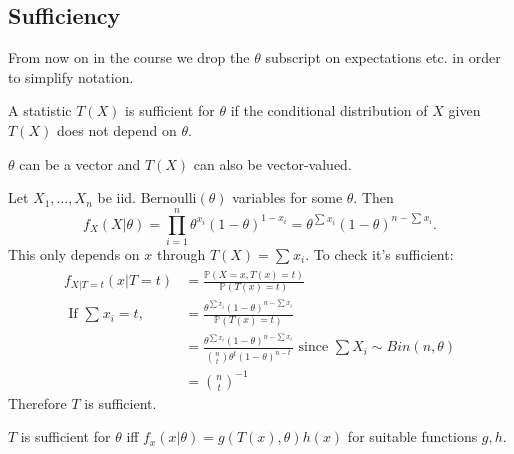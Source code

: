 \documentclass[a4paper]{scrartcl}
\begin{document}
\subsection{Sufficiency}
\begin{notation}
     From now on in the course we drop the $\theta$ subscript on expectations etc. in order to simplify notation.
\end{notation}
\begin{definition*}[Sufficiency]
     A statistic $T (X)$ is sufficient for $\theta$ if the conditional distribution of $X$ given $T (X)$ does not depend on $\theta$.
\end{definition*}
\begin{remark}
      $\theta$ can be a vector and $T (X)$ can also be vector-valued.
\end{remark}
\begin{example*}
      Let $X_1 , \ldots ,X_n$ be iid. Bernoulli$(\theta)$  variables for some $\theta$. Then \[
      f_{X}(X|\theta)=\prod_{i=1}^n \theta^{x_{i}}(1-\theta)^{1-x_{i}}=\theta^{\sum_{}^{}x_{i}} (1-\theta)^{n-\sum_{}^{}x_{i}}
      .\] This only depends on $x$ through $T (X)=\sum_{}^{}x_{i}$. To check it's sufficient: 
      \begin{align*}
           f_{X|T=t}(x|T=t)&= \frac{\mathbb{P}(X=x, T (x)=t)}{\mathbb{P} (T (x)=t)}\\
           \text{ If } \sum_{}^{}x_i =t, \quad &= \frac{\theta^{\sum x_i}(1-\theta)^{n-\sum x_i}}{\mathbb{P}(T (x)=t)}\\
           &= \frac{\theta^{\sum x_i}(1-\theta)^{n-\sum x_i}}{{n \choose t}\theta^{t}(1-\theta)^{n-t}} \text{ since } \sum X_i \sim Bin (n,\theta)\\
           &= {n \choose t}^{-1}
      \end{align*}
      Therefore $T$ is sufficient.
\end{example*}
\begin{theorem}
     $T$ is sufficient for $\theta$ iff $f_{x}(x| \theta)=g (T (x), \theta)h (x)$ for suitable functions $g,h$.
\end{theorem}
\end{document}
